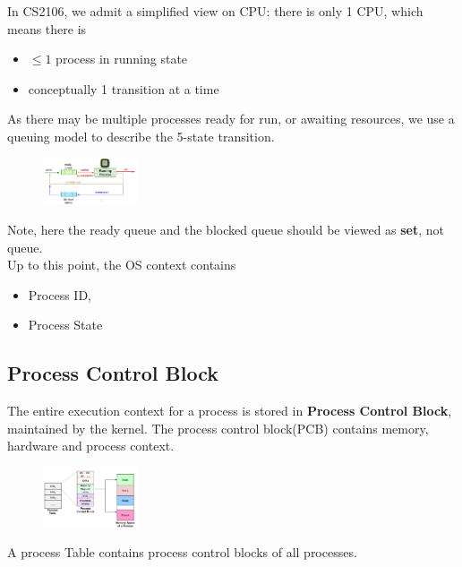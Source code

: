 \documentclass[11pt]{article}
\theoremstyle{definition}
\begin{document}
In CS2106, we admit a simplified view on CPU: there is only 1 CPU, which means there is
\begin{itemize}[itemsep=0pt]
  \item $\leq 1$ process in running state
  \item conceptually 1 transition at a time
\end{itemize}
As there may be multiple processes ready for run, or awaiting resources, we use a queuing model to describe the 5-state transition.
\begin{figure}[h]
\centering
\includegraphics[width=0.25\textwidth]{2_4.png}
\end{figure}
Note, here the ready queue and the blocked queue should be viewed as \textbf{set}, not queue.\\

Up to this point, the OS context contains
\begin{itemize}[itemsep=0pt]
  \item Process ID,
  \item Process State
\end{itemize}
\subsection{Process Control Block}
The entire execution context for a process is stored in \textbf{Process Control Block}, maintained by the kernel. The process control block(PCB) contains memory, hardware and process context.\\
\begin{figure}[h]
\centering
\includegraphics[width=0.25\textwidth]{2_5.png}
\end{figure}
 A process Table contains process control blocks of all processes.
\end{document}
